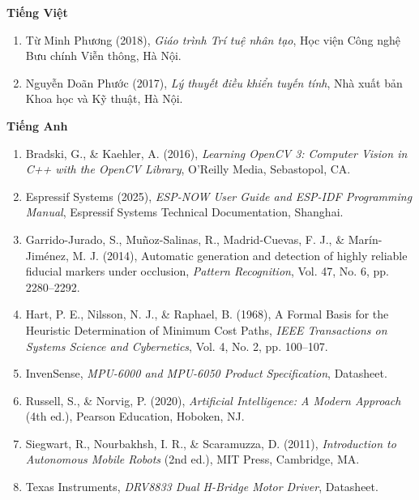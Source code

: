 \documentclass[12pt,a4paper]{report}
\begin{document}
	\noindent\textbf{Tiếng Việt}
	\begin{enumerate}[leftmargin=1.2cm]
		\item Từ Minh Phương (2018), \textit{Giáo trình Trí tuệ nhân tạo}, Học viện Công nghệ Bưu chính Viễn thông, Hà Nội.
		\item Nguyễn Doãn Phước (2017), \textit{Lý thuyết điều khiển tuyến tính}, Nhà xuất bản Khoa học và Kỹ thuật, Hà Nội.
	\end{enumerate}
	
	\vspace{0.3cm}
	\noindent\textbf{Tiếng Anh}
	\begin{enumerate}[leftmargin=1.2cm, start=3]
		\item Bradski, G., \& Kaehler, A. (2016), \textit{Learning OpenCV 3: Computer Vision in C++ with the OpenCV Library}, O'Reilly Media, Sebastopol, CA.
		\item Espressif Systems (2025), \textit{ESP-NOW User Guide and ESP-IDF Programming Manual}, Espressif Systems Technical Documentation, Shanghai.
		\item Garrido-Jurado, S., Muñoz-Salinas, R., Madrid-Cuevas, F. J., \& Marín-Jiménez, M. J. (2014), Automatic generation and detection of highly reliable fiducial markers under occlusion, \textit{Pattern Recognition}, Vol. 47, No. 6, pp. 2280--2292.
		\item Hart, P. E., Nilsson, N. J., \& Raphael, B. (1968), A Formal Basis for the Heuristic Determination of Minimum Cost Paths, \textit{IEEE Transactions on Systems Science and Cybernetics}, Vol. 4, No. 2, pp. 100--107.
		\item InvenSense, \textit{MPU-6000 and MPU-6050 Product Specification}, Datasheet.
		\item Russell, S., \& Norvig, P. (2020), \textit{Artificial Intelligence: A Modern Approach} (4th ed.), Pearson Education, Hoboken, NJ.
		\item Siegwart, R., Nourbakhsh, I. R., \& Scaramuzza, D. (2011), \textit{Introduction to Autonomous Mobile Robots} (2nd ed.), MIT Press, Cambridge, MA.
		\item Texas Instruments, \textit{DRV8833 Dual H-Bridge Motor Driver}, Datasheet.
	\end{enumerate}
	
\end{document}
